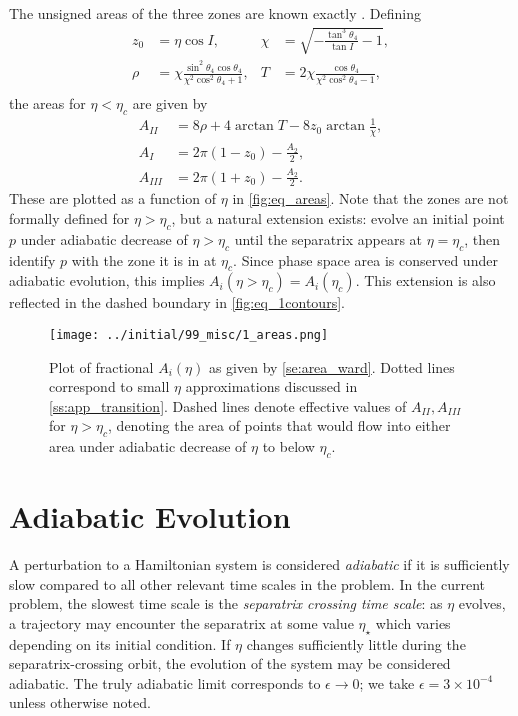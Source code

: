 \documentclass[
        fleqn,
        usenatbib,
    ]{mnras}
\newcommand*{\p}[1]{\left(#1\right)}
\begin{document}
The unsigned areas of the three zones are known exactly
\citep{henrard1987,ward2004I}. Defining
\begin{align*}
    z_0 &= \eta\cos I, &
    \chi &= \sqrt{-\frac{\tan^3\theta_4}{\tan I} - 1},\\
    \rho &= \chi \frac{\sin^2 \theta_4\cos \theta_4}{
        \chi^2 \cos^2\theta_4 + 1},&
    T &= 2\chi \frac{\cos \theta_4}{
        \chi^2 \cos^2\theta_4 - 1},\\
\end{align*}
the areas for $\eta < \eta_c$ are given by
\begin{subequations}\label{se:area_ward}
    \begin{align}
        A_{II} &= 8\rho + 4\arctan T - 8z_0 \arctan \frac{1}{\chi},\\
        A_I &= 2\pi\p{1 - z_0} - \frac{A_2}{2},\\
        A_{III} &= 2\pi\p{1 + z_0} - \frac{A_2}{2}.
    \end{align}
\end{subequations}
These are plotted as a function of $\eta$ in \autoref{fig:eq_areas}. Note that
the zones are not formally defined for $\eta > \eta_c$, but a natural extension
exists: evolve an initial point $p$ under adiabatic decrease of $\eta > \eta_c$
until the separatrix appears at $\eta = \eta_c$, then identify $p$ with the zone
it is in at $\eta_c$. Since phase space area is conserved under adiabatic
evolution, this implies $A_i\p{\eta > \eta_c} = A_i(\eta_c)$. This extension is
also reflected in the dashed boundary in \autoref{fig:eq_1contours}.
\begin{figure}
    \centering
    \texttt{[image: ../initial/99\_misc/1\_areas.png]}
    \caption{Plot of fractional $A_{i}(\eta)$ as given by
    \autoref{se:area_ward}. Dotted lines correspond to small $\eta$
    approximations discussed in \autoref{ss:app_transition}. Dashed lines denote
    effective values of $A_{II}, A_{III}$ for $\eta > \eta_c$, denoting the
    area of points that would flow into either area under adiabatic decrease of
    $\eta$ to below $\eta_c$.}\label{fig:eq_areas}
\end{figure}

\section{Adiabatic Evolution}\label{s:ad}

A perturbation to a Hamiltonian system is considered \emph{adiabatic} if it is
sufficiently slow compared to all other relevant time scales in the problem.
In the current problem, the slowest time scale is the \emph{separatrix crossing
time scale}: as $\eta$ evolves, a trajectory may encounter the separatrix at
some value $\eta_\star$ which varies depending on its initial condition. If
$\eta$ changes sufficiently little during the separatrix-crossing orbit, the
evolution of the system may be considered adiabatic. The truly adiabatic limit
corresponds to $\epsilon \to 0$; we take $\epsilon = 3 \times 10^{-4}$ unless
otherwise noted.
\end{document}
